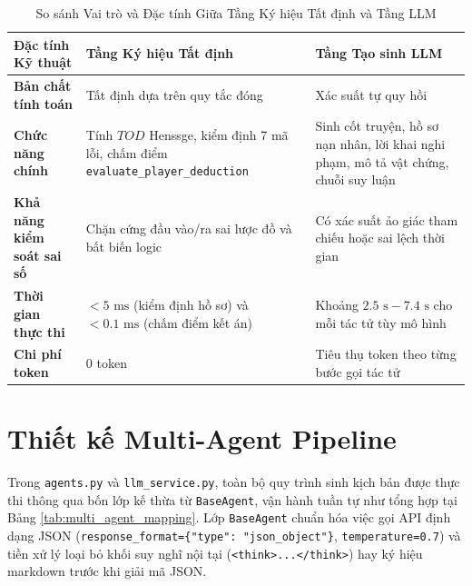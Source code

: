 \begin{table}[H]
\centering
\caption{So sánh Vai trò và Đặc tính Giữa Tầng Ký hiệu Tất định và Tầng LLM}
\label{tab:decoupled_layer_comparison}
\begin{tabularx}{\textwidth}{l X X}
\toprule
\textbf{Đặc tính Kỹ thuật} & \textbf{Tầng Ký hiệu Tất định} & \textbf{Tầng Tạo sinh LLM} \\
\midrule
\textbf{Bản chất tính toán} & Tất định dựa trên quy tắc đóng & Xác suất tự quy hồi \\
\textbf{Chức năng chính} & Tính $TOD$ Henssge, kiểm định 7 mã lỗi, chấm điểm \texttt{evaluate\_player\_deduction} & Sinh cốt truyện, hồ sơ nạn nhân, lời khai nghi phạm, mô tả vật chứng, chuỗi suy luận \\
\textbf{Khả năng kiểm soát sai số} & Chặn cứng đầu vào/ra sai lược đồ và bất biến logic & Có xác suất ảo giác tham chiếu hoặc sai lệch thời gian \\
\textbf{Thời gian thực thi} & $< 5\text{ ms}$ (kiểm định hồ sơ) và $< 0.1\text{ ms}$ (chấm điểm kết án) & Khoảng $2.5\text{ s} - 7.4\text{ s}$ cho mỗi tác tử tùy mô hình \\
\textbf{Chi phí token} & 0 token & Tiêu thụ token theo từng bước gọi tác tử \\
\bottomrule
\end{tabularx}
\end{table}

\section{Thiết kế Multi-Agent Pipeline}
\label{sec:arch_multi_agent}

Trong \texttt{agents.py} và \texttt{llm\_service.py}, toàn bộ quy trình sinh kịch bản được thực thi thông qua bốn lớp kế thừa từ \texttt{BaseAgent}, vận hành tuần tự như tổng hợp tại Bảng \ref{tab:multi_agent_mapping}. Lớp \texttt{BaseAgent} chuẩn hóa việc gọi API định dạng JSON (\texttt{response\_format=\{"type": "json\_object"\}}, \texttt{temperature=0.7}) và tiền xử lý loại bỏ khối suy nghĩ nội tại (\texttt{<think>...</think>}) hay ký hiệu markdown trước khi giải mã JSON.

